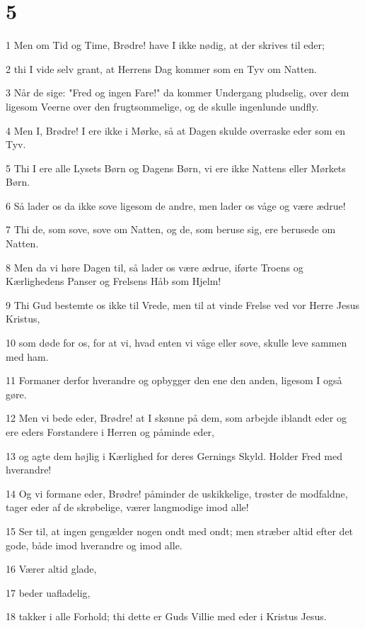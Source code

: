 \chapter{5}

\par 1 Men om Tid og Time, Brødre! have I ikke nødig, at der skrives til eder;
\par 2 thi I vide selv grant, at Herrens Dag kommer som en Tyv om Natten.
\par 3 Når de sige: "Fred og ingen Fare!" da kommer Undergang pludselig, over dem ligesom Veerne over den frugtsommelige, og de skulle ingenlunde undfly.
\par 4 Men I, Brødre! I ere ikke i Mørke, så at Dagen skulde overraske eder som en Tyv.
\par 5 Thi I ere alle Lysets Børn og Dagens Børn, vi ere ikke Nattens eller Mørkets Børn.
\par 6 Så lader os da ikke sove ligesom de andre, men lader os våge og være ædrue!
\par 7 Thi de, som sove, sove om Natten, og de, som beruse sig, ere berusede om Natten.
\par 8 Men da vi høre Dagen til, så lader os være ædrue, iførte Troens og Kærlighedens Panser og Frelsens Håb som Hjelm!
\par 9 Thi Gud bestemte os ikke til Vrede, men til at vinde Frelse ved vor Herre Jesus Kristus,
\par 10 som døde for os, for at vi, hvad enten vi våge eller sove, skulle leve sammen med ham.
\par 11 Formaner derfor hverandre og opbygger den ene den anden, ligesom I også gøre.
\par 12 Men vi bede eder, Brødre! at I skønne på dem, som arbejde iblandt eder og ere eders Forstandere i Herren og påminde eder,
\par 13 og agte dem højlig i Kærlighed for deres Gernings Skyld. Holder Fred med hverandre!
\par 14 Og vi formane eder, Brødre! påminder de uskikkelige, trøster de modfaldne, tager eder af de skrøbelige, værer langmodige imod alle!
\par 15 Ser til, at ingen gengælder nogen ondt med ondt; men stræber altid efter det gode, både imod hverandre og imod alle.
\par 16 Værer altid glade,
\par 17 beder uafladelig,
\par 18 takker i alle Forhold; thi dette er Guds Villie med eder i Kristus Jesus.
